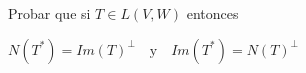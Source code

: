 \item Probar que si $T\in L(V,W)$ entonces 
    \begin{center}
        $N(T^*)=Im(T)^\perp\quad\text{y}\quad Im(T^*)=N(T)^\perp$
    \end{center}
    \begin{mdframed}[style=s]
        
    \end{mdframed}